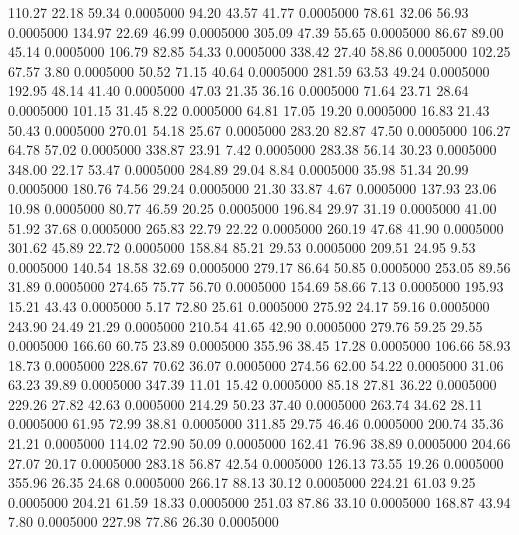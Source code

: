  110.27   22.18   59.34   0.0005000
  94.20   43.57   41.77   0.0005000
  78.61   32.06   56.93   0.0005000
 134.97   22.69   46.99   0.0005000
 305.09   47.39   55.65   0.0005000
  86.67   89.00   45.14   0.0005000
 106.79   82.85   54.33   0.0005000
 338.42   27.40   58.86   0.0005000
 102.25   67.57    3.80   0.0005000
  50.52   71.15   40.64   0.0005000
 281.59   63.53   49.24   0.0005000
 192.95   48.14   41.40   0.0005000
  47.03   21.35   36.16   0.0005000
  71.64   23.71   28.64   0.0005000
 101.15   31.45    8.22   0.0005000
  64.81   17.05   19.20   0.0005000
  16.83   21.43   50.43   0.0005000
 270.01   54.18   25.67   0.0005000
 283.20   82.87   47.50   0.0005000
 106.27   64.78   57.02   0.0005000
 338.87   23.91    7.42   0.0005000
 283.38   56.14   30.23   0.0005000
 348.00   22.17   53.47   0.0005000
 284.89   29.04    8.84   0.0005000
  35.98   51.34   20.99   0.0005000
 180.76   74.56   29.24   0.0005000
  21.30   33.87    4.67   0.0005000
 137.93   23.06   10.98   0.0005000
  80.77   46.59   20.25   0.0005000
 196.84   29.97   31.19   0.0005000
  41.00   51.92   37.68   0.0005000
 265.83   22.79   22.22   0.0005000
 260.19   47.68   41.90   0.0005000
 301.62   45.89   22.72   0.0005000
 158.84   85.21   29.53   0.0005000
 209.51   24.95    9.53   0.0005000
 140.54   18.58   32.69   0.0005000
 279.17   86.64   50.85   0.0005000
 253.05   89.56   31.89   0.0005000
 274.65   75.77   56.70   0.0005000
 154.69   58.66    7.13   0.0005000
 195.93   15.21   43.43   0.0005000
   5.17   72.80   25.61   0.0005000
 275.92   24.17   59.16   0.0005000
 243.90   24.49   21.29   0.0005000
 210.54   41.65   42.90   0.0005000
 279.76   59.25   29.55   0.0005000
 166.60   60.75   23.89   0.0005000
 355.96   38.45   17.28   0.0005000
 106.66   58.93   18.73   0.0005000
 228.67   70.62   36.07   0.0005000
 274.56   62.00   54.22   0.0005000
  31.06   63.23   39.89   0.0005000
 347.39   11.01   15.42   0.0005000
  85.18   27.81   36.22   0.0005000
 229.26   27.82   42.63   0.0005000
 214.29   50.23   37.40   0.0005000
 263.74   34.62   28.11   0.0005000
  61.95   72.99   38.81   0.0005000
 311.85   29.75   46.46   0.0005000
 200.74   35.36   21.21   0.0005000
 114.02   72.90   50.09   0.0005000
 162.41   76.96   38.89   0.0005000
 204.66   27.07   20.17   0.0005000
 283.18   56.87   42.54   0.0005000
 126.13   73.55   19.26   0.0005000
 355.96   26.35   24.68   0.0005000
 266.17   88.13   30.12   0.0005000
 224.21   61.03    9.25   0.0005000
 204.21   61.59   18.33   0.0005000
 251.03   87.86   33.10   0.0005000
 168.87   43.94    7.80   0.0005000
 227.98   77.86   26.30   0.0005000

